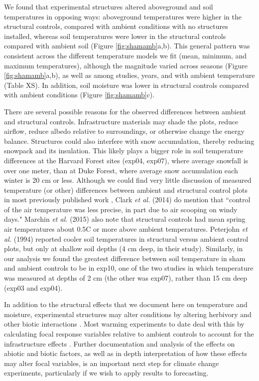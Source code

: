 \documentclass{article}
\begin{document}
\par We found that experimental structures altered aboveground and soil temperatures in opposing ways: aboveground temperatures were higher in the structural controls, compared with ambient conditions with no structures installed, whereas soil temperatures were lower in the structural controls compared with ambient soil (Figure \ref{fig:shamamb}a,b). This general pattern was consistent across the different temperature models we fit (mean, minimum, and maximum temperatures), although the magnitude varied across seasons (Figure \ref{fig:shamamb}a,b), as well as among studies, years, and with ambient temperature (Table XS). In addition, soil moisture was lower in structural controls compared with ambient conditions (Figure \ref{fig:shamamb}c). 
\par There are several possible reasons for the observed differences between ambient and structural controls. Infrastructure materials may shade the plots, reduce airflow, reduce albedo relative to surroundings, or otherwise change the energy balance. Structures could also interfere with snow accumulation, thereby reducing snowpack and its insulation. This likely plays a bigger role in soil temperature differences at the Harvard Forest sites (exp04, exp07), where average snowfall is over one meter, than at Duke Forest, where average snow accumulation each winter is 20 cm or less. Although we could find very little discussion of measured temperature (or other) differences between ambient and structural control plots in most previously published work \citep[e.g.,][]{farnsworth1995,pelini2011,clark2014a,clark2014b}, Clark \textit{et al.} (2014) do mention that ``control of the air temperature was less precise, in part due to air scooping on windy days." Marchin \textit{et al.} (2015) also note that structural controls had mean spring air temperatures about  0.5\degree C or more above ambient temperatures. Peterjohn \textit{et al.} (1994) reported cooler soil temperatures in structural versus ambient control plots, but only at shallow soil depths (4 cm deep, in their study). Similarly, in our analysis we found the greatest difference between soil temperature in sham and ambient controls to be in exp10, one of the two studies in which temperature was measured at depths of 2 cm (the other was exp07), rather than 15 cm deep (exp03 and exp04). 
\par In addition to the structural effects that we document here on temperature and moisture, experimental structures may alter conditions by altering herbivory and other biotic interactions \citep{kennedy1995,moise2010,wolkovich2012,hoeppner2012}. Most warming experiments to date deal with this by calculating focal response variables relative to ambient controls to account for the infrastructure effects \citep [e.g.,][]{marchin2015}. Further documentation and analysis of the effects on abiotic and biotic factors, as well as in depth interpretation of how these effects may alter focal variables, is an important next step for climate change experiments, particularly if we wish to apply results to forecasting.
\end{document}

